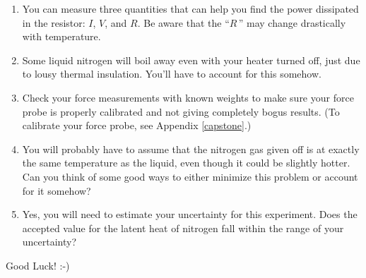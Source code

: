\begin{enumerate}

\item You can measure three quantities that can help you find the power
dissipated in the resistor: $I$, $V$, and $R$. Be aware that the ``$\!R\,$'' may change drastically with temperature.

\item Some liquid nitrogen will boil away even with your heater turned off, just due to lousy thermal insulation. You'll have to account for this somehow.

\item Check your force measurements with known weights to make sure your force probe is properly calibrated and not giving completely bogus results.  (To calibrate your force probe, see Appendix \ref{capstone}.) 

\item You will probably have to assume that the nitrogen gas given off is at exactly the same temperature as the liquid, even though it could be slightly hotter. Can you think of some good ways to either minimize this problem or account for it somehow?

\item Yes, you will need to estimate your uncertainty for this experiment. Does the accepted value for the latent heat of nitrogen fall within the range of your uncertainty?

\end{enumerate}

Good Luck!  :-)
